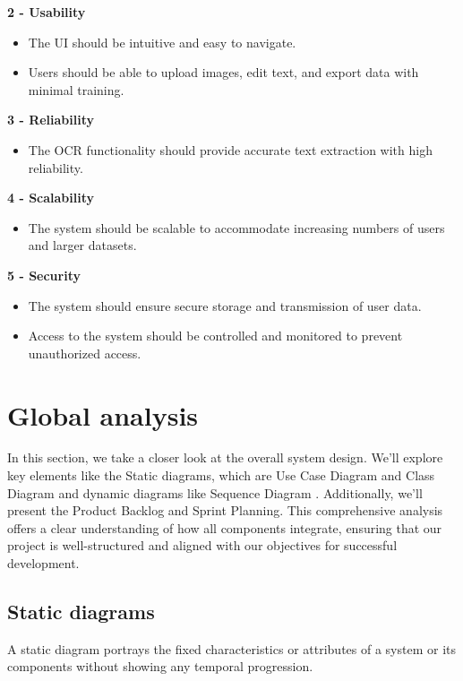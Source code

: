 \textbf{\large 2 - Usability }
\begin{itemize}
    \item The UI should be intuitive and easy to navigate.
    \item Users should be able to upload images, edit text, and export data with minimal training.
\end{itemize}
\vspace{4mm}

\textbf{\large 3 - Reliability }
\begin{itemize}
    \item The OCR functionality should provide accurate text extraction with high reliability.
\end{itemize}
\vspace{4mm}

\textbf{\large 4 - Scalability }
\begin{itemize}
    \item The system should be scalable to accommodate increasing numbers of users and larger datasets.
\end{itemize}
\vspace{4mm}

\textbf{\large 5 - Security }\\
\begin{itemize}
    \item The system should ensure secure storage and transmission of user data.
    \item Access to the system should be controlled and monitored to prevent unauthorized access.
\end{itemize}
\vspace{2mm}

\newpage

\section{Global analysis}
In this section, we take a closer look at the overall system design. We'll explore key elements like the Static diagrams, which are  Use Case Diagram and Class Diagram and dynamic diagrams like Sequence Diagram . Additionally, we'll present the Product Backlog and Sprint Planning. This comprehensive analysis offers a clear understanding of how all components integrate, ensuring that our project is well-structured and aligned with our objectives for successful development.

\subsection{Static diagrams}
A static diagram portrays the fixed characteristics or attributes of a system or its components without showing any temporal progression.
